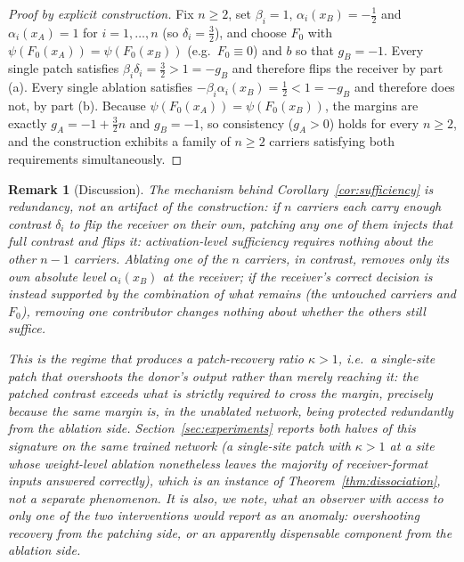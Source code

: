 \documentclass[11pt,a4paper]{article}
\newtheorem{remark}{Remark}
\begin{document}
\begin{proof}[Proof by explicit construction]
Fix $n\ge2$, set $\beta_i=1$, $\alpha_i(x_B)=-\tfrac12$ and $\alpha_i(x_A)=1$
for $i=1,\dots,n$ (so $\delta_i=\tfrac32$), and choose $F_0$ with
$\psi(F_0(x_A))=\psi(F_0(x_B))$ (e.g.\ $F_0\equiv0$) and $b$ so that
$g_B=-1$. Every single patch satisfies $\beta_i\delta_i=\tfrac32>1=-g_B$
and therefore flips the receiver by part (a). Every single ablation satisfies
$-\beta_i\alpha_i(x_B)=\tfrac12<1=-g_B$ and therefore does not, by part
(b). Because $\psi(F_0(x_A))=\psi(F_0(x_B))$, the margins are exactly
$g_A=-1+\tfrac32 n$ and $g_B=-1$, so consistency ($g_A>0$) holds for
every $n\ge2$, and the construction exhibits a family of $n\ge2$ carriers
satisfying both requirements simultaneously.
\end{proof}

\begin{remark}[Discussion]
\label{rem:redundancy}
The mechanism behind Corollary~\ref{cor:sufficiency} is redundancy, not an
artifact of the construction: if $n$ carriers each carry enough
\emph{contrast} $\delta_i$ to flip the receiver on their own, patching any one
of them injects that full contrast and flips it: activation-level
sufficiency requires nothing about the other $n-1$ carriers. Ablating one of
the $n$ carriers, in contrast, removes only its own \emph{absolute} level
$\alpha_i(x_B)$ at the receiver; if the receiver's correct decision is instead
supported by the combination of what remains (the untouched carriers and
$F_0$), removing one contributor changes nothing about whether the others
still suffice.

This is the regime that produces a patch-recovery ratio $\kappa>1$, i.e.\ a
single-site patch that \emph{overshoots} the donor's output rather than merely
reaching it: the patched contrast exceeds what is strictly required to cross
the margin, precisely because the same margin is, in the unablated network,
being protected redundantly from the ablation side. Section~\ref{sec:experiments}
reports both halves of this signature on the same trained network (a
single-site patch with $\kappa>1$ at a site whose weight-level ablation
nonetheless leaves the majority of receiver-format inputs answered correctly),
which is an instance of Theorem~\ref{thm:dissociation}, not a separate
phenomenon. It is also, we note, what an observer with access to only one of
the two interventions would report as an anomaly: overshooting recovery from
the patching side, or an apparently dispensable component from the ablation
side.
\end{remark}
\end{document}
